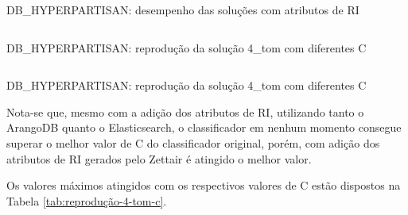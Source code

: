 \documentclass[%
  10pt,%
  aspectratio = 169,%
  compress,%
  t,%
]{beamer}%
\begin{document}
    
    \begin{frame}{}{DB\_HYPERPARTISAN: desempenho das soluções com atributos de RI}
        \begin{columns}[T]
                \vspace{-0.5cm}
                
                \vspace{-0.5cm}
                
        \end{columns}
    \end{frame}
    
    \begin{frame}{}{DB\_HYPERPARTISAN: reprodução da solução 4\_tom com diferentes C}
        \begin{columns}[T]
                \vspace{-0.5cm}
                
                \vspace{-0.5cm}
                
        \end{columns}
    \end{frame}

    \begin{frame}{}{DB\_HYPERPARTISAN: reprodução da solução 4\_tom com diferentes C}
        
        Nota-se que, mesmo com a adição dos atributos de RI, utilizando tanto o ArangoDB quanto o Elasticsearch, o classificador em nenhum momento consegue superar o melhor valor de C do classificador original, porém, com adição dos atributos de RI gerados pelo Zettair é atingido o melhor valor.

        Os valores máximos atingidos com os respectivos valores de C estão dispostos na Tabela \ref{tab:reprodução-4-tom-c}.
        
        
    \end{frame}
\end{document}
